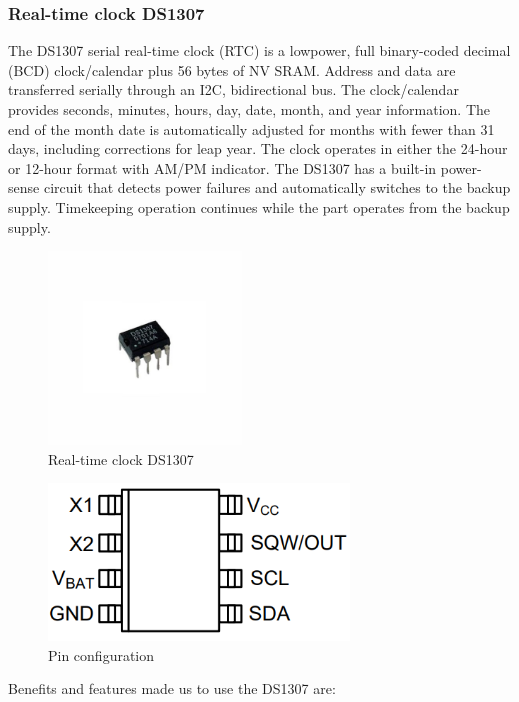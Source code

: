 \documentclass[a4paper]{article}
\begin{document}
\subsubsection{Real-time clock DS1307}
The DS1307 serial real-time clock (RTC) is a lowpower, full binary-coded decimal (BCD) clock/calendar plus 56 bytes of NV SRAM. Address and data are transferred serially through an I2C, bidirectional bus. The clock/calendar provides seconds, minutes, hours, day, date, month, and year information. The end of the month date is automatically adjusted for months with fewer than 31 days, including corrections for leap year. The clock operates in either the 24-hour or 12-hour format with AM/PM indicator. The DS1307 has a built-in power-sense circuit that detects power failures
and automatically switches to the backup supply. Timekeeping operation continues while the part operates from the backup supply.
\begin{figure}[h!]
\centering
\includegraphics[width=5.13cm]{images/dsa.jpg}
\caption*{Real-time clock DS1307}
\end{figure}
\begin{figure}[h!]
\centering
\includegraphics[width=8cm]{images/dsa_pins.PNG}
\caption*{Pin configuration}
\end{figure}
\newline
\noindent
Benefits and features made us to use the DS1307 are:
\end{document}
